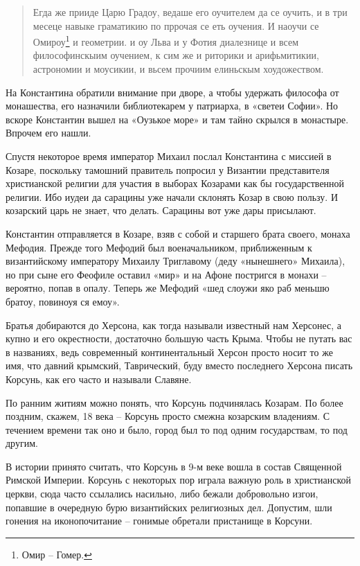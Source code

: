 \begin{quotation} 
Егда же прииде Царю Градоу, ведаше его оучителем да се оучить, и в три месеце навыке граматикию по пррочая се еть оучения. И наоучи се Омироу\footnote{Омир – Гомер.} и геометрии. и оу Льва и у Фотия диалезнице и всем философинскыим оучением, к сим же и риторики и арифьмитикии, астрономии и моусикии, и вьсем прочиим елиньскым хоудожеством.
\end{quotation} 

На Константина обратили внимание при дворе, а чтобы удержать философа от монашества, его назначили библиотекарем у патриарха, в «светеи Софии». Но вскоре Константин вышел на «Оузькое море» и там тайно скрылся в монастыре. Впрочем его нашли.
 
Спустя некоторое время император Михаил послал Константина с миссией в Козаре, поскольку тамошний правитель попросил у Византии представителя христианской религии для участия в выборах Козарами как бы государственной религии. Ибо иудеи да сарацины уже начали склонять Козар в свою пользу. И козарский царь не знает, что делать. Сарацины вот уже дары присылают.

Константин отправляется в Козаре, взяв с собой и старшего брата своего, монаха Мефодия. Прежде того Мефодий был военачальником, приближенным к византийскому императору Михаилу Триглавому (деду «нынешнего» Михаила), но при сыне его Феофиле оставил «мир» и на Афоне постригся в монахи – вероятно, попав в опалу. Теперь же Мефодий «шед слоужи яко раб меньшю братоу, повиноуя ся емоу».

Братья добираются до Херсона, как тогда называли известный нам Херсонес, а купно и его окрестности, достаточно большую часть Крыма. Чтобы не путать вас в названиях, ведь современный континентальный Херсон просто носит то же имя, что давний крымский, Таврический, буду вместо последнего Херсона писать Корсунь, как его часто и называли Славяне.

По ранним житиям можно понять, что Корсунь подчинялась Козарам. По более поздним, скажем, 18 века – Корсунь просто смежна козарским владениям. С течением времени так оно и было, город был то под одним государствам, то под другим. 

В истории принято считать, что Корсунь в 9-м веке вошла в состав Священной Римской Империи. Корсунь с некоторых пор играла важную роль в христианской церкви, сюда часто ссылались насильно, либо бежали добровольно изгои, попавшие в очередную бурю византийских религиозных дел. Допустим, шли гонения на иконопочитание – гонимые обретали пристанище в Корсуни.


